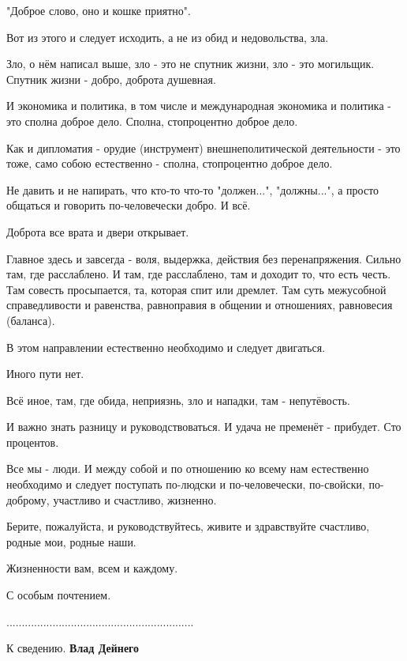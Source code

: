 \begin{itemize}
"Доброе слово, оно и кошке приятно".

Вот из этого и следует исходить, а не из обид и недовольства, зла.

Зло, о нём написал выше, зло - это не спутник жизни, зло - это могильщик.
Спутник жизни - добро, доброта душевная.

И экономика и политика, в том числе и международная экономика и политика - это
сполна доброе дело. Сполна, стопроцентно доброе дело.

Как и дипломатия - орудие (инструмент) внешнеполитической деятельности - это
тоже, само собою естественно - сполна, стопроцентно доброе дело.

Не давить и не напирать, что кто-то что-то "должен...", "должны...", а просто
общаться и говорить по-человечески добро. И всё.

Доброта все врата и двери открывает.

Главное здесь и завсегда - воля, выдержка, действия без перенапряжения. Сильно
там, где расслаблено. И там, где расслаблено, там и доходит то, что есть честь.
Там совесть просыпается, та, которая спит или дремлет. Там суть межусобной
справедливости и равенства, равноправия в общении и отношениях, равновесия
(баланса).

В этом направлении естественно необходимо и следует двигаться.

Иного пути нет.

Всё иное, там, где обида, неприязнь, зло и нападки, там - непутёвость.

И важно знать разницу и руководствоваться. И удача не пременёт - прибудет. Сто
процентов.

Все мы - люди. И между собой и по отношению ко всему нам естественно необходимо
и следует поступать по-людски и по-человечески, по-свойски, по-доброму,
участливо и счастливо, жизненно.

Берите, пожалуйста, и руководствуйтесь, живите и здравствуйте счастливо, родные
мои, родные наши.

Жизненности вам, всем и каждому.

С особым почтением.

.............................................................

К сведению. \textbf{Влад Дейнего}

\end{itemize} %
